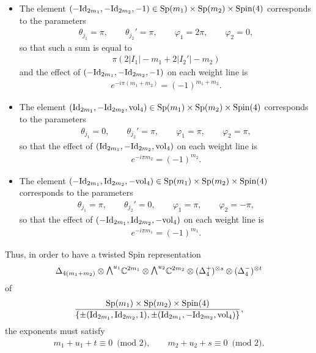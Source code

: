 \documentclass[pdftex]{sigma}
\newcommand{\ext}{\raise1pt\hbox{$\textstyle\bigwedge$}}
\numberwithin{equation}{section}
\begin{document}
\begin{itemize}\itemsep=0pt
\item The element $(-{\rm Id}_{2m_1},-{\rm Id}_{2m_2},-1)\in {\rm Sp}(m_1)\times {\rm Sp}(m_2)\times {\rm Spin}(4)$ corresponds to the parameters
\begin{gather*}
 \theta_{j_1} = \pi , \qquad \theta_{j_2}' = \pi , \qquad \varphi_1 = 2\pi,\qquad \varphi_2 = 0,
\end{gather*}
so that such a sum is equal to
\begin{gather*}\pi(2|I_1| - m_1 + 2|I_2'|-m_2) \end{gather*}
and the ef\/fect of $(-{\rm Id}_{2m_1},-{\rm Id}_{2m_2},-1)$ on each weight line is
\begin{gather*}e^{-i\pi(m_1+m_2)} = (-1)^{m_1+m_2}.
\end{gather*}

\item The element $({\rm Id}_{2m_1},-{\rm Id}_{2m_2},{\rm vol}_4)\in {\rm Sp}(m_1)\times {\rm Sp}(m_2)\times {\rm Spin}(4)$ corresponds to the parameters
\begin{gather*}
 \theta_{j_1} = 0 , \qquad \theta_{j_2}' = \pi , \qquad \varphi_1 = \pi,\qquad \varphi_2 = \pi,
\end{gather*}
so that the ef\/fect of $({\rm Id}_{2m_1},-{\rm Id}_{2m_2},{\rm vol}_4)$ on each weight line is
\begin{gather*}e^{-i\pi m_2} = (-1)^{m_2}.
\end{gather*}

\item The element $(-{\rm Id}_{2m_1},{\rm Id}_{2m_2},-{\rm vol}_4)\in {\rm Sp}(m_1)\times {\rm Sp}(m_2)\times {\rm Spin}(4)$ corresponds to the parameters
\begin{gather*}
 \theta_{j_1} = \pi , \qquad \theta_{j_2}' = 0 , \qquad \varphi_1 = \pi,\qquad
 \varphi_2 = -\pi,
\end{gather*}
so that the ef\/fect of $(-{\rm Id}_{2m_1},{\rm Id}_{2m_2},-{\rm vol}_4)$ on each weight line is
\begin{gather*}e^{-i\pi m_1} = (-1)^{m_1}.
\end{gather*}
\end{itemize}

Thus, in order to have a twisted Spin representation
\begin{gather*}\Delta_{4(m_1+m_2)}\otimes \ext^{u_1} \mathbb{C}^{2m_1}\otimes \ext^{u_2} \mathbb{C}^{2m_2}\otimes (\Delta_4^+)^{\otimes s}\otimes (\Delta_4^-)^{\otimes t}\end{gather*}
of \begin{gather*}{{\rm Sp}(m_1)\times {\rm Sp}(m_2)\times {\rm Spin}(4)\over \{\pm ({\rm Id}_{2m_1},{\rm Id}_{2m_2},1),\pm ({\rm Id}_{2m_1},-{\rm Id}_{2m_2},{\rm vol}_4)\}},\end{gather*} the exponents must satisfy
\begin{gather*}
m_1+u_1+t \equiv 0\,\,\,\mbox{(mod 2)} ,\qquad m_2+u_2+s \equiv 0\,\,\,\mbox{(mod 2)} .
\end{gather*}
\end{document}
